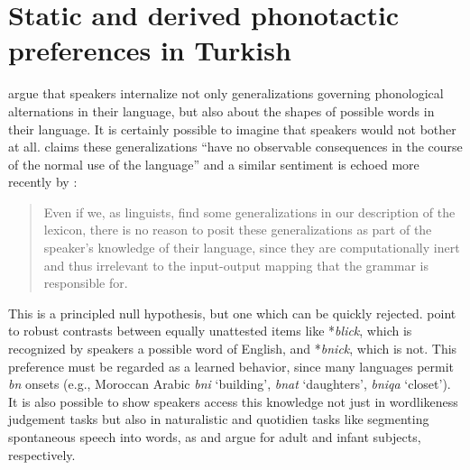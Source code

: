 \chapter{Static and derived phonotactic preferences in Turkish}

\citet{Chomsky1965} argue that speakers internalize not only generalizations governing phonological alternations in their language, but also about the shapes of possible words in their language. It is certainly possible to imagine that speakers would not bother at all. \citet[][320]{Zimmer1969} claims these generalizations ``have no observable consequences in the course of the normal use of the language'' and a similar sentiment is echoed more recently by \citeauthor{PE}:

\begin{quote}
Even if we, as linguists, find some generalizations in our description of the lexicon, there is no reason to posit these generalizations as part of the speaker's knowledge of their language, since they are computationally inert and thus irrelevant to the input-output mapping that the grammar is responsible for. \citep[][18]{PE}
\end{quote}

This is a principled null hypothesis, but one which can be quickly rejected. \citeauthor{Chomsky1965} point to robust contrasts between equally unattested items like *\emph{blick}, which is recognized by speakers a possible word of English, and *\emph{bnick}, which is not.
This preference must be regarded as a learned behavior, since many languages permit  \emph{bn} onsets (e.g., Moroccan Arabic \emph{bni} `building', \emph{bnat} `daughters', \emph{bniqa} `closet'). It is also possible to show speakers access this knowledge not just in wordlikeness judgement tasks but also in naturalistic and quotidien tasks like segmenting spontaneous speech into words, as \citet{McQueen1998} and \citet{Mattys2001b} argue for adult and infant subjects, respectively.

